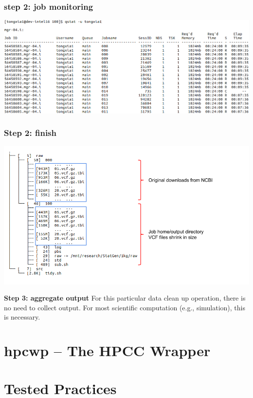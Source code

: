 \documentclass{beamer}
\begin{document}
\begin{frame}
  \frametitle{step 2: job monitoring}
  \includegraphics[width=1.0\linewidth]{img/step_2_c}
\end{frame}
\begin{frame}
  \frametitle{Step 2: finish}
  \includegraphics[width=1.0\linewidth]{img/step_2_d}
\end{frame}

\begin{frame}
\textbf{Step 3: aggregate output}
For this particular data clean up operation, there is no need to collect output. For most scientific
computation (e.g., simulation), this is necessary.
\end{frame}

\section{hpcwp -- The HPCC Wrapper}

\section{Tested Practices}
\end{document}
